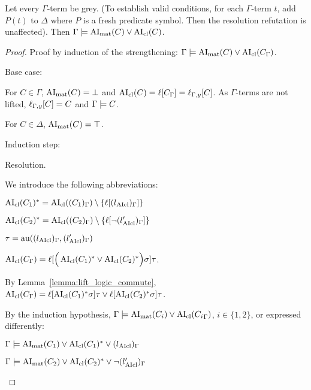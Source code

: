 \documentclass[,%
	paper=a4,%
	DIV14, %
	twoside=false,%
	liststotoc,
	bibtotoc,
	draft=false,%
	numbers=noendperiod
]{scrartcl}
\begin{document}
\begin{lemma}
	\label{ref:gamma_entails_delta_terms_lifted}
	Let every $\Gamma$-term be grey. (To establish valid conditions, for each $\Gamma$-term $t$, add $P(t)$ to $\Delta$ where $P$ is a fresh predicate symbol. Then the resolution refutation is unaffected).
	Then
	$\Gamma \models \operatorname{AI}_\mathrm{mat}(C) \lor \operatorname{AI}_\mathrm{cl}(C)$.
\end{lemma}
\begin{proof}
	Proof by induction of the strengthening:
	$\Gamma \models \operatorname{AI}_\mathrm{mat}(C) \lor \operatorname{AI}_\mathrm{cl}(C_\Gamma)$.

	Base case:

	For $C \in \Gamma$, $\operatorname{AI}_\mathrm{mat}(C) = \bot$ and $\operatorname{AI}_\mathrm{cl}(C) = \ell[C_\Gamma] = \ell_{\Gamma,y}[C]$. As $\Gamma$-terms are not lifted, $\ell_{\Gamma,y}[C] = C$ and $\Gamma \models C$.

	For $C \in \Delta$, $\operatorname{AI}_\mathrm{mat}(C) = \top$.

	Induction step:


	\begin{description}
		\item{Resolution.}
			\begin{prooftree}
			\end{prooftree}
			We introduce the following abbreviations:

			$ \operatorname{AI}_\mathrm{cl}(C_1)^* = \operatorname{AI}_\mathrm{cl}((C_1)_\Gamma) \setminus \{\ell[(l{_{\operatorname{AIcl}}})_\Gamma]\}$

			$ \operatorname{AI}_\mathrm{cl}(C_2)^* = \operatorname{AI}_\mathrm{cl}((C_2)_\Gamma)\setminus \{\ell[\lnot (l{_{\operatorname{AIcl}}'})_\Gamma]\}$

			$\tau  = \operatorname{au}((l{_{\operatorname{AIcl}}})_\Gamma, (l{_{\operatorname{AIcl}}'})_\Gamma)$

			$\operatorname{AI}_\mathrm{cl}(C_\Gamma) =
			\ell[\Big( \operatorname{AI}_\mathrm{cl}(C_1)^* \lor \operatorname{AI}_\mathrm{cl}(C_2)^* \Big)\sigma] \tau$.

			By Lemma~\ref{lemma:lift_logic_commute},
			$\operatorname{AI}_\mathrm{cl}(C_\Gamma) =
			\ell[\operatorname{AI}_\mathrm{cl}(C_1)^*\sigma]\tau \lor \ell[\operatorname{AI}_\mathrm{cl}(C_2)^*\sigma] \tau$.

			By the induction hypothesis,
			$\Gamma \models \operatorname{AI}_\mathrm{mat}(C_i) \lor \operatorname{AI}_\mathrm{cl}({C_i}_\Gamma)$, $i\in\{1,2\}$, or expressed differently:


			$\Gamma \models \operatorname{AI}_\mathrm{mat}(C_1) \lor \operatorname{AI}_\mathrm{cl}(C_1)^* \lor {(l{\ensuremath{_{\operatorname{AIcl}}}})_\Gamma}$

			$\Gamma \models \operatorname{AI}_\mathrm{mat}(C_2) \lor \operatorname{AI}_\mathrm{cl}(C_2)^* \lor {\lnot (l{\ensuremath{_{\operatorname{AIcl}}}'})_\Gamma}$


\end{description}
\end{proof}
\end{document}
